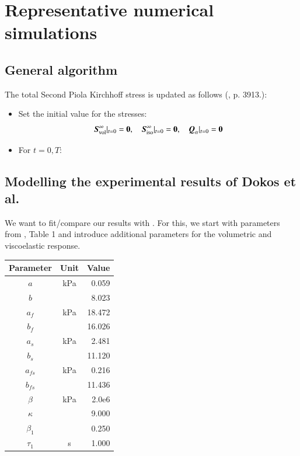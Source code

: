\section{Representative numerical simulations}
\label{numerical-simulations}

\subsection{General algorithm}
\label{general-algorithm}

The total Second Piola Kirchhoff stress is updated as follows
(\cite{Holzapfel:1996}, p. 3913.):

\begin{itemize}
\item Set the initial value for the stresses:
  \begin{displaymath}
    \mbox{\boldmath$ S$}_{\mathrm{vol}}^{\infty}|_{t = 0} = {\bf 0}, \quad
    \mbox{\boldmath$ S$}_{\mathrm{iso}}^{\infty}|_{t = 0} = {\bf 0}, \quad
    \mbox{\boldmath$ Q$}_{\alpha}|_{t = 0} = {\bf 0}
  \end{displaymath}
\item For $t = {0, T}$:
\end{itemize}

\subsection{Modelling the experimental results of Dokos et al.}
\label{simulating-experiment}

We want to fit/compare our results with \cite{Dokos:2002}. For this,
we start with parameters from \cite{Holzapfel:2009bb}, Table 1 and
introduce additional parameters for the volumetric and viscoelastic
response.

\begin{tabular}{| c | c | r | }
  \hline
  Parameter & Unit & Value\\
  \hline
  $a$         & kPa  & 0.059\\
  $b$         &      & 8.023\\
  $a_{f}$     & kPa  & 18.472\\
  $b_{f}$     &      & 16.026\\
  $a_{s}$     & kPa  & 2.481\\
  $b_{s}$     &      & 11.120\\
  $a_{fs}$    & kPa  & 0.216\\
  $b_{fs}$    &      & 11.436\\
  $\beta$     & kPa  & 2.0e6 \\
  $\kappa$    &      & 9.000\\
  $\beta_{1}$ &      & 0.250\\
  $\tau_{1}$  & s    & 1.000\\
  \hline
\end{tabular}

